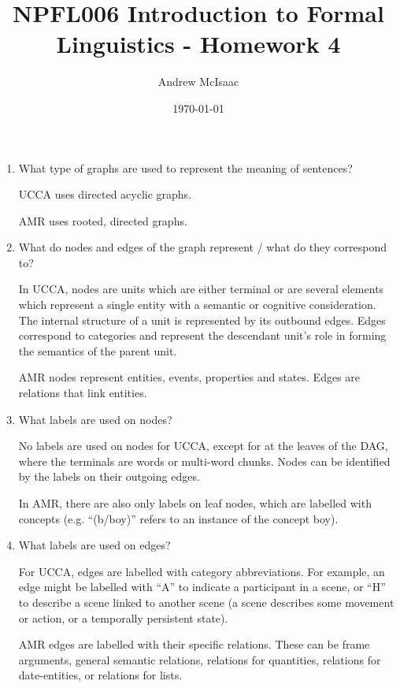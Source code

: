 \documentclass[a4paper]{article}
\title{NPFL006 Introduction to Formal Linguistics - Homework 4}
\date{\today}
\author{Andrew McIsaac}
\begin{document}
\maketitle

	\begin{enumerate}
		\item What type of graphs are used to represent the meaning of sentences?

			UCCA uses directed acyclic graphs.

			AMR uses rooted, directed graphs.

		\item What do nodes and edges of the graph represent / what do they
			correspond to?

			In UCCA, nodes are units which are either terminal or are several
			elements which represent a single entity with a semantic or
			cognitive consideration. The internal structure of a unit is
			represented by its outbound edges.
			Edges correspond to categories and represent the descendant unit's
			role in forming the semantics of the parent unit.

			AMR nodes represent entities, events, properties and states. Edges
			are relations that link entities.

		\item What labels are used on nodes?

			No labels are used on nodes for UCCA, except for at the leaves of
			the DAG, where the terminals are words or multi-word chunks. Nodes
			can be identified by the labels on their outgoing edges.

			In AMR, there are also only labels on leaf nodes, which are labelled
			with concepts (e.g. ``(b/boy)'' refers to an instance of the concept
			boy).

		\item What labels are used on edges?

			For UCCA, edges are labelled with category abbreviations. For
			example, an edge might be labelled with ``A'' to indicate a
			participant in a scene, or ``H'' to describe a scene linked to another
			scene (a scene describes some movement or action, or a temporally
			persistent state).

			AMR edges are labelled with their specific relations. These can be
			frame arguments, general semantic relations, relations for
			quantities, relations for date-entities, or relations for lists.

	\end{enumerate}
\end{document}
